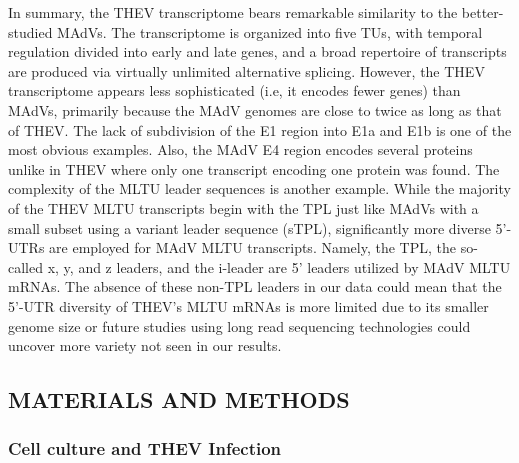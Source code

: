 \documentclass[
]{article}
\begin{document}
In summary, the THEV transcriptome bears remarkable similarity to the
better-studied MAdVs. The transcriptome is organized into five TUs, with
temporal regulation divided into early and late genes, and a broad
repertoire of transcripts are produced via virtually unlimited
alternative splicing. However, the THEV transcriptome appears less
sophisticated (i.e, it encodes fewer genes) than MAdVs, primarily
because the MAdV genomes are close to twice as long as that of THEV. The
lack of subdivision of the E1 region into E1a and E1b is one of the most
obvious examples. Also, the MAdV E4 region encodes several proteins
unlike in THEV where only one transcript encoding one protein was found.
The complexity of the MLTU leader sequences is another example. While
the majority of the THEV MLTU transcripts begin with the TPL just like
MAdVs with a small subset using a variant leader sequence (sTPL),
significantly more diverse 5'-UTRs are employed for MAdV MLTU
transcripts. Namely, the TPL, the so-called x, y, and z leaders, and the
i-leader are 5' leaders utilized by MAdV MLTU mRNAs. The absence of
these non-TPL leaders in our data could mean that the 5'-UTR diversity
of THEV's MLTU mRNAs is more limited due to its smaller genome size or
future studies using long read sequencing technologies could uncover
more variety not seen in our results. \newpage

\subsection{MATERIALS AND METHODS}\label{materials-and-methods}

\subsubsection{Cell culture and THEV
Infection}\label{cell-culture-and-thev-infection}
\end{document}
